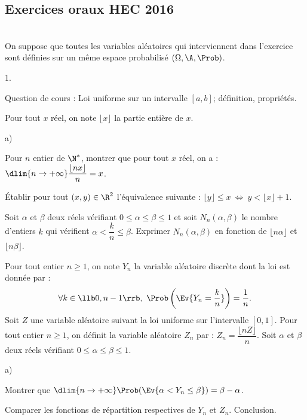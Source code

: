 \subsection*{Exercices oraux HEC 2016}


\begin{exerciceAP}~\\
On suppose que toutes les variables aléatoires qui interviennent dans 
l'exercice sont définies sur un même espace probabilisé $(\Omega, 
\A,\Prob)$.
\begin{noliste}{1.}
    \setlength{\itemsep}{2mm}
  \item Question de cours : Loi uniforme sur un intervalle $[a,b]$;
    définition, propriétés.
  
  \item Pour tout $x$ réel, on note $\lfloor x \rfloor$ la partie 
  entière de $x$.
  \begin{noliste}{a)}
    \setlength{\itemsep}{2mm}
    \item Pour $n$ entier de $\N^*$, montrer que pour tout $x$ réel, 
    on a : $\dlim{n\to+\infty} \dfrac{\lfloor nx\rfloor}{n}=x$.
    
    \item Établir pour tout $(x,y)\in\R^2$ l'équivalence suivante 
    : $\lfloor y \rfloor \leq x \ \Leftrightarrow \ y < \lfloor x 
    \rfloor +1$.
    
    \item Soit $\alpha$ et $\beta$ deux réels vérifiant $0\leq 
    \alpha\leq \beta\leq 1$ et soit $N_n(\alpha,\beta)$ le nombre 
    d'entiers $k$ qui vérifient $\alpha <\dfrac{k}{n}\leq \beta$. 
    Exprimer $N_n(\alpha,\beta)$ en fonction de $\lfloor n\alpha 
    \rfloor$ et $\lfloor n\beta \rfloor$.
  \end{noliste}
  
  \item Pour tout entier $n\geq 1$, on note $Y_n$ la variable aléatoire 
  discrète dont la loi est donnée par :
  \[
    \forall k\in\llb 0,n-1\rrb, \ 
    \Prob\left(\Ev{Y_n=\frac{k}{n}}\right)=\frac{1}{n}.
  \]
  Soit $Z$ une variable aléatoire suivant la loi uniforme sur 
  l'intervalle $[0,1]$. Pour tout entier $n\geq 1$, on définit la 
  variable aléatoire $Z_n$ par : $Z_n=\dfrac{\lfloor nZ\rfloor}{n}$. 
  Soit $\alpha$ et $\beta$ deux réels vérifiant $0\leq \alpha\leq 
  \beta\leq 1$.
  \begin{noliste}{a)}
    \setlength{\itemsep}{2mm}
    \item Montrer que $\dlim{n\to+\infty} \Prob(\Ev{\alpha <Y_n\leq 
    \beta})=\beta-\alpha$.
    
    \item Comparer les fonctions de répartition respectives de $Y_n$ 
    et $Z_n$. Conclusion.
  \end{noliste}
\end{noliste}
\end{exerciceAP} 



